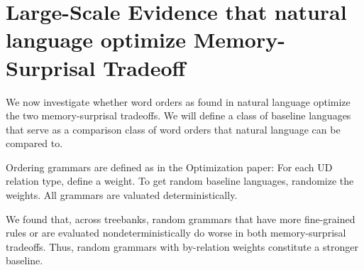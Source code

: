 \documentclass[11pt,letterpaper]{article}
\begin{document}
%
%
%
%
%
%
%
%


\section{Large-Scale Evidence that natural language optimize Memory-Surprisal Tradeoff}

We now investigate whether word orders as found in natural language optimize the two memory-surprisal tradeoffs.
We will define a class of baseline languages that serve as a comparison class of word orders that natural language can be compared to.

Ordering grammars are defined as in the Optimization paper: For each UD relation type, define a weight. To get random baseline languages, randomize the weights.
All grammars are valuated deterministically.

We found that, across treebanks, random grammars that have more fine-grained rules or are evaluated nondeterministically do worse in both memory-surprisal tradeoffs.
Thus, random grammars with by-relation weights constitute a stronger baseline.


\end{document}
